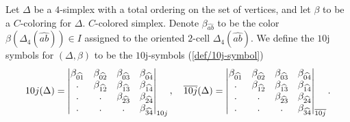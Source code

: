 \begin{definition}\label{def/10j-symbol-for-a-C-colored-simplex}
  Let $\Delta$ be a $4$-simplex with a total ordering on the set
  of vertices, and let $\beta$ to be a $C$-coloring for $\Delta$.
  $C$-colored simplex. Denote $\beta_{\widehat{ab}}$ to be the
  color $\beta(\Delta_{4}(\widehat{ab})) \in I$ assigned to the
  oriented $2$-cell $\Delta_{4}(\widehat{ab})$. We define the
  $10$j symbols for $(\Delta,\beta)$ to be the $10$j-symbols
  (\ref{def/10j-symbol})
  $$
  10j(\Delta) = \begin{vmatrix} \beta_{\widehat{01}} & \beta_{\widehat{02}} & \beta_{\widehat{03}} & \beta_{\widehat{04}} \\ . & \beta_{\widehat{12}} & \beta_{\widehat{13}} & \beta_{\widehat{14}} \\ . & . & \beta_{\widehat{23}} & \beta_{\widehat{24}} \\ . & . & . & \beta_{\widehat{34}} \\ \end{vmatrix}_{10j}, \quad
  \overline{10j}(\Delta) = \begin{vmatrix} \beta_{\widehat{01}} & \beta_{\widehat{02}} & \beta_{\widehat{03}} & \beta_{\widehat{04}} \\ . & \beta_{\widehat{12}} & \beta_{\widehat{13}} & \beta_{\widehat{14}} \\ . & . & \beta_{\widehat{23}} & \beta_{\widehat{24}} \\ . & . & . & \beta_{\widehat{34}} \\ \end{vmatrix}_{\overline{10j}}.
  $$
\end{definition}

